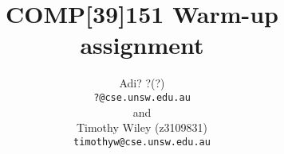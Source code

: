\documentclass[12pt,a4paper]{scrartcl}
\begin{document}
\title{COMP[39]151 Warm-up assignment}
\author{Adi? ?(?) \\ 
        \texttt{?@cse.unsw.edu.au} \\ 
        and \\ 
        Timothy Wiley (z3109831) \\
        \texttt{timothyw@cse.unsw.edu.au} }

\maketitle


\end{document}
